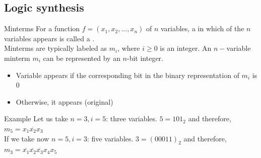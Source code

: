 \subsection{Logic synthesis}
\begin{parag}{Minterms}
    For a function $f = (x_1, x_2, \dots, x_n)$ of $n$ variables, a  in which  of the $n$ variables appears  is called a .\\
    Minterms are typically labeled as $m_i$, where $i \geq 0$ is an integer. An $n-$variable minterm $m_i$ can be represented by an $n$-bit integer. 
    \begin{itemize}
        \item Variable appears  if the corresponding bit in the binary representation of $m_i$ is $0$
        \item Otherwise, it appears  (original)
    \end{itemize}
    \begin{subparag}{Example}
        Let us take $n = 3, i = 5$: three variables. $5 = 101_2$ and therefore, $m_5 = x_1 \overline{x_2}x_3$\\
        If we take now $n = 5, i = 3$: five variables. $3 = (00011)_2$ and therefore, $m_3 = \overline{x_1} \overline{x_2} \overline{x_3} x_4 x_5$
       
        
    \end{subparag}
\end{parag}
